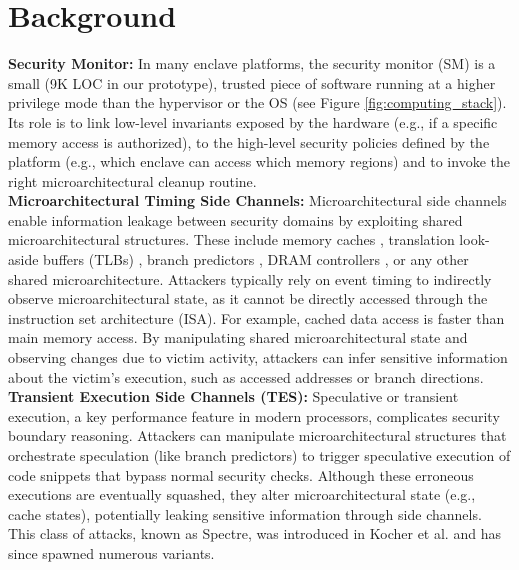 \section{Background}

\noindent\textbf{Security Monitor:}
\label{sec:securitymonitor}
In many enclave platforms, the security monitor (SM) \cite{costan2016sanctum, lebedev2019sanctorum} is a small (9K LOC in our prototype), trusted piece of software running at a higher privilege mode than the hypervisor or the OS (see Figure \ref{fig:computing_stack}).
Its role is to link low-level invariants exposed by the hardware (e.g., if a specific memory access is authorized), to the high-level security policies defined by the platform (e.g., which enclave can access which memory regions) and to invoke the right microarchitectural cleanup routine.
\\ 

\noindent\textbf{Microarchitectural Timing Side Channels:}
Microarchitectural side channels enable information leakage between security domains by exploiting shared microarchitectural structures. These include memory caches \cite{gotzfried2017cache, brasser2017software}, translation look-aside buffers (TLBs) \cite{gras2018translation}, branch predictors \cite{evtyushkin2018branchscope, aciiccmez2006predicting}, DRAM controllers \cite{wang2014timing}, or any other shared microarchitecture. Attackers typically rely on event timing to indirectly observe microarchitectural state, as it cannot be directly accessed through the instruction set architecture (ISA).
For example, cached data access is faster than main memory access. By manipulating shared microarchitectural state and observing changes due to victim activity, attackers can infer sensitive information about the victim's execution, such as accessed addresses or branch directions.
\\ 

\noindent\textbf{Transient Execution Side Channels (TES):}
\label{sec:specandside}
Speculative or transient execution, a key performance feature in modern processors, complicates security boundary reasoning.
Attackers can manipulate microarchitectural structures that orchestrate speculation (like branch predictors) to trigger speculative execution of code snippets that bypass normal security checks.
Although these erroneous executions are eventually squashed, they alter microarchitectural state (e.g., cache states), potentially leaking sensitive information through side channels.
This class of attacks, known as Spectre, was introduced in Kocher et al. \cite{kocher2018spectre} and has since spawned numerous variants.
\\

